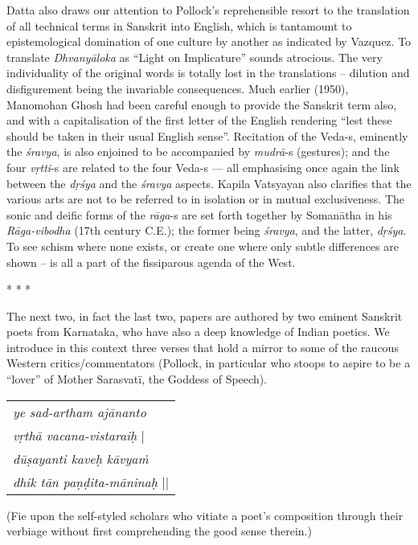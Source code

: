 Datta also draws our attention to Pollock’s reprehensible resort to the translation of all technical terms in Sanskrit into English, which is tantamount to epistemological domination of one culture by another as indicated by Vazquez. To translate \textsl{Dhvanyāloka} as “Light on Implicature” sounds atrocious. The very individuality of the original words is totally lost in the translations -- dilution and disfigurement being the invariable consequences. Much earlier (1950), Manomohan Ghosh had been careful enough to provide the Sanskrit term also, and with a capitalisation of the first letter of the English rendering “lest these should be taken in their usual English sense”. Recitation of the \hbox{Veda-s}, eminently the \textsl{śravya}, is also enjoined to be accompanied by \hbox{\textsl{mudrā}-s} (gestures); and the four \textsl{vṛtti}-s are related to the four Veda-s --- all emphasising once again the link between the \textsl{dṛśya} and the \textsl{śravya} aspects. Kapila Vatsyayan also clarifies that the various arts are not to be referred to in isolation or in mutual exclusiveness. The sonic and deific forms of the \textsl{rāga}-s are set forth together by Somanātha in his \textsl{Rāga-vibodha} (17th century C.E.); the former being \textsl{śravya}, and the latter, \textsl{dṛśya}. To see schism where none exists, or create one where only subtle differences are shown -- is all a part of the fissiparous agenda of the West.
\begin{center}
* * *
\end{center}
The next two, in fact the last two, papers are authored by two eminent Sanskrit poets from Karnataka, who have also a deep knowledge of Indian poetics. We introduce in this context three verses that hold a mirror to some of the raucous Western critics/commentators (Pollock, in particular who stoops to aspire to be a ``lover'' of Mother Sarasvatī, the Goddess of Speech).
\begin{center}
\begin{tabular}{l}
\textsl{ye sad-artham ajānanto}\\
\phantom{aaaaaa}\textsl{vṛthā vacana-vistaraiḥ} |\\
\textsl{dūṣayanti kaveḥ kāvyaṁ}\\
\phantom{aaaaaa}\textsl{dhik tān paṇḍita-māninaḥ} ||
\end{tabular}
\end{center}
(Fie upon the self-styled scholars who vitiate a poet's composition through their verbiage without first comprehending the good sense therein.)


